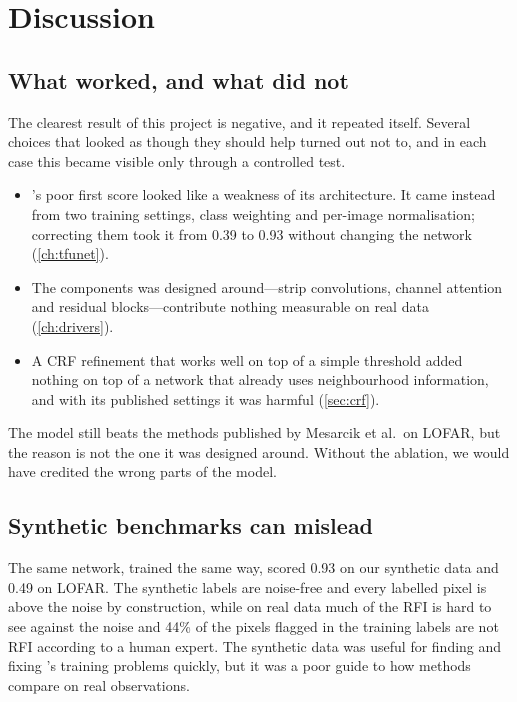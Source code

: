 \chapter{Discussion}
\label{ch:discussion}

\section{What worked, and what did not}
The clearest result of this project is negative, and it repeated itself. Several
choices that looked as though they should help turned out not to, and in each
case this became visible only through a controlled test.

\begin{itemize}
  \item \tfunet{}'s poor first score looked like a weakness of its architecture.
    It came instead from two training settings, class weighting and per-image
    normalisation; correcting them took it from 0.39 to 0.93 without changing
    the network (\cref{ch:tfunet}).
  \item The components \hybrid{} was designed around---strip convolutions,
    channel attention and residual blocks---contribute nothing measurable on
    real data (\cref{ch:drivers}).
  \item A CRF refinement that works well on top of a simple threshold added
    nothing on top of a network that already uses neighbourhood information,
    and with its published settings it was harmful (\cref{sec:crf}).
\end{itemize}

The model still beats the methods published by Mesarcik et al.\ on LOFAR,
but the reason is not the one it was designed around. Without the ablation, we would have
credited the wrong parts of the model.

\section{Synthetic benchmarks can mislead}
The same network, trained the same way, scored 0.93 on our synthetic data and
0.49 on LOFAR. The synthetic labels are noise-free and every labelled pixel is
above the noise by construction, while on real data much of the RFI is
hard to see against the noise and 44\% of the pixels flagged in the
training labels are not RFI according to a human expert. The synthetic data was useful for finding
and fixing \tfunet{}'s training problems quickly, but it was a poor guide to
how methods compare on real observations.

